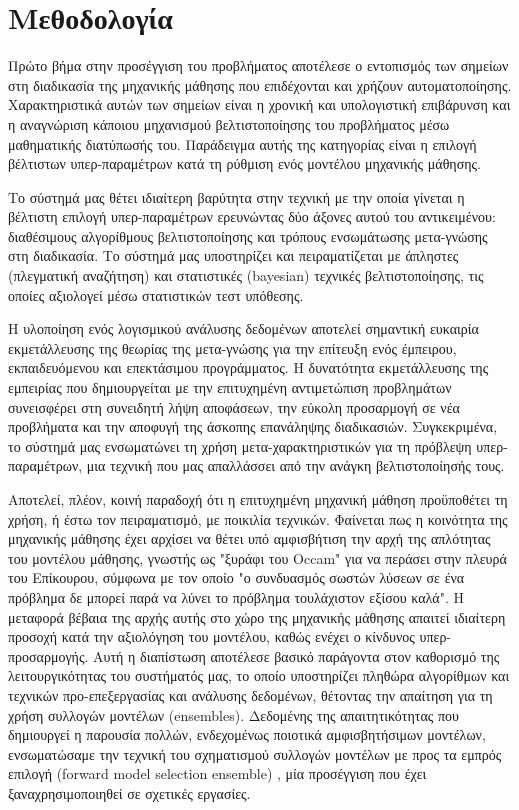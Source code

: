 \section{Μεθοδολογία}
Πρώτο βήμα στην προσέγγιση του προβλήματος αποτέλεσε ο εντοπισμός των σημείων στη διαδικασία της μηχανικής μάθησης που επιδέχονται και χρήζουν αυτοματοποίησης. Χαρακτηριστικά αυτών των σημείων είναι η χρονική και υπολογιστική επιβάρυνση και η αναγνώριση κάποιου μηχανισμού βελτιστοποίησης του προβλήματος μέσω μαθηματικής διατύπωσής του. Παράδειγμα αυτής της κατηγορίας είναι η επιλογή βέλτιστων υπερ-παραμέτρων κατά τη ρύθμιση ενός μοντέλου μηχανικής μάθησης.

Το σύστημά μας θέτει ιδιαίτερη βαρύτητα στην τεχνική με την οποία γίνεται η βέλτιστη επιλογή υπερ-παραμέτρων ερευνώντας δύο άξονες αυτού του αντικειμένου: διαθέσιμους αλγορίθμους βελτιστοποίησης και τρόπους ενσωμάτωσης μετα-γνώσης στη διαδικασία. Το σύστημά μας υποστηρίζει και πειραματίζεται με άπληστες (πλεγματική αναζήτηση) και στατιστικές (bayesian) τεχνικές βελτιστοποίησης, τις οποίες αξιολογεί μέσω στατιστικών τεστ υπόθεσης.

Η υλοποίηση ενός λογισμικού ανάλυσης δεδομένων αποτελεί σημαντική ευκαιρία εκμετάλλευσης της θεωρίας της μετα-γνώσης για την επίτευξη ενός έμπειρου, εκπαιδευόμενου και επεκτάσιμου προγράμματος. Η δυνατότητα εκμετάλλευσης της εμπειρίας που δημιουργείται με την επιτυχημένη αντιμετώπιση προβλημάτων συνεισφέρει στη συνειδητή λήψη αποφάσεων, την εύκολη προσαρμογή σε νέα προβλήματα και την αποφυγή της άσκοπης επανάληψης διαδικασιών. Συγκεκριμένα, το σύστημά μας ενσωματώνει τη χρήση μετα-χαρακτηριστικών για τη πρόβλεψη υπερ-παραμέτρων, μια τεχνική που μας απαλλάσσει από την ανάγκη βελτιστοποίησής τους. 

Αποτελεί, πλέον, κοινή παραδοχή ότι η επιτυχημένη μηχανική μάθηση προϋποθέτει τη χρήση, ή έστω τον πειραματισμό, με ποικιλία τεχνικών. Φαίνεται πως η κοινότητα της μηχανικής μάθησης έχει αρχίσει να θέτει υπό αμφισβήτιση την αρχή της απλότητας του μοντέλου μάθησης, γνωστής ως "ξυράφι του Occam" για να περάσει στην πλευρά του Επίκουρου, σύμφωνα με τον οποίο "ο συνδυασμός σωστών λύσεων σε ένα πρόβλημα δε μπορεί παρά να λύνει το πρόβλημα τουλάχιστον εξίσου καλά". Η μεταφορά βέβαια της αρχής αυτής στο χώρο της μηχανικής μάθησης απαιτεί ιδιαίτερη προσοχή κατά την αξιολόγηση του μοντέλου, καθώς ενέχει ο κίνδυνος υπερ-προσαρμογής. Αυτή η διαπίστωση αποτέλεσε βασικό παράγοντα στον καθορισμό της λειτουργικότητας του συστήματός μας, το οποίο υποστηρίζει πληθώρα αλγορίθμων και τεχνικών προ-επεξεργασίας και ανάλυσης δεδομένων, θέτοντας την απαίτηση για τη χρήση συλλογών μοντέλων (ensembles). Δεδομένης της απαιτητικότητας που δημιουργεί η παρουσία πολλών, ενδεχομένως ποιοτικά αμφισβητήσιμων μοντέλων, ενσωματώσαμε την τεχνική του σχηματισμού συλλογών μοντέλων με προς τα εμπρός επιλογή (forward model selection ensemble) \citep{Caruana:2004:ESL:1015330.1015432}, μία προσέγγιση που έχει ξαναχρησιμοποιηθεί σε σχετικές εργασίες.

